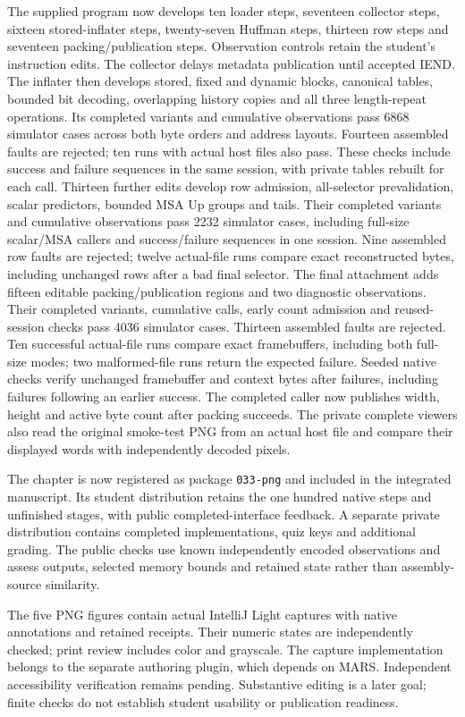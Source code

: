 The supplied program now develops ten loader steps, seventeen collector steps,
sixteen stored-inflater steps, twenty-seven Huffman steps, thirteen row steps and
seventeen packing/publication steps. Observation controls
retain the student's instruction edits. The collector delays metadata publication
until accepted IEND. The inflater then develops stored, fixed and dynamic blocks,
canonical tables, bounded bit decoding, overlapping history copies and all three
length-repeat operations. Its completed variants and cumulative observations pass
6868 simulator cases across both byte orders and address layouts. Fourteen assembled
faults are rejected; ten runs with actual host files also pass. These checks include
success and failure sequences in the same session, with private tables rebuilt for
each call. Thirteen further edits develop row admission, all-selector prevalidation, scalar
predictors, bounded MSA Up groups and tails. Their completed variants and cumulative
observations pass 2232 simulator cases, including full-size scalar/MSA callers and
success/failure sequences in one session. Nine assembled row faults are rejected;
twelve actual-file runs compare exact reconstructed bytes, including unchanged rows
after a bad final selector. The final attachment adds fifteen editable packing/publication regions and two
diagnostic observations. Their completed variants, cumulative calls, early count
admission and reused-session checks pass 4036 simulator cases. Thirteen assembled
faults are rejected. Ten successful actual-file runs compare exact framebuffers,
including both full-size modes; two malformed-file runs return the expected failure.
Seeded native checks verify unchanged framebuffer and context bytes after failures,
including failures following an earlier success. The completed caller now publishes
width, height and active byte count after packing succeeds. The private complete viewers also read
the original smoke-test PNG from an actual host file and compare their displayed words
with independently decoded pixels.

The chapter is now registered as package \texttt{033-png} and included in the
integrated manuscript. Its student distribution retains the one hundred native
steps and unfinished stages, with public completed-interface feedback. A separate
private distribution contains completed implementations, quiz keys and additional
grading. The public checks use known independently encoded observations and assess
outputs, selected memory bounds and retained state rather than assembly-source
similarity.

The five PNG figures contain actual IntelliJ Light captures with native annotations
and retained receipts. Their numeric states are independently checked; print review
includes color and grayscale. The capture implementation belongs to the separate
authoring plugin, which depends on MARS. Independent accessibility verification
remains pending. Substantive editing is a later goal; finite checks do not establish
student usability or publication readiness.
